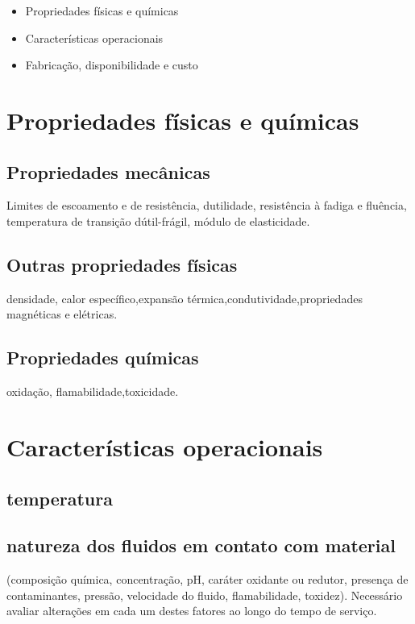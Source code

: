 \begin{itemize}
	\setlength{\parskip}{0pt}
	\setlength{\itemsep}{0pt plus 1pt}
	
	\item Propriedades físicas e químicas 
	\item Características operacionais
	\item Fabricação, disponibilidade e custo
	
\end{itemize}


\section{Propriedades físicas e químicas}

\subsection*{Propriedades mecânicas}
Limites de escoamento e de resistência, dutilidade, resistência à fadiga e fluência, temperatura de transição dútil-frágil, módulo de elasticidade.

\subsection{Outras propriedades físicas}
densidade, calor específico,expansão térmica,condutividade,propriedades magnéticas e elétricas.


\subsection*{Propriedades químicas}
oxidação, flamabilidade,toxicidade.

\section{Características operacionais}

\subsection*{temperatura}
\subsection*{natureza dos fluidos em contato com material}
(composição química, concentração, pH, caráter oxidante ou redutor, presença de contaminantes, pressão, velocidade do fluido, flamabilidade, toxidez). Necessário avaliar alterações em cada um destes fatores ao longo do tempo de serviço.

